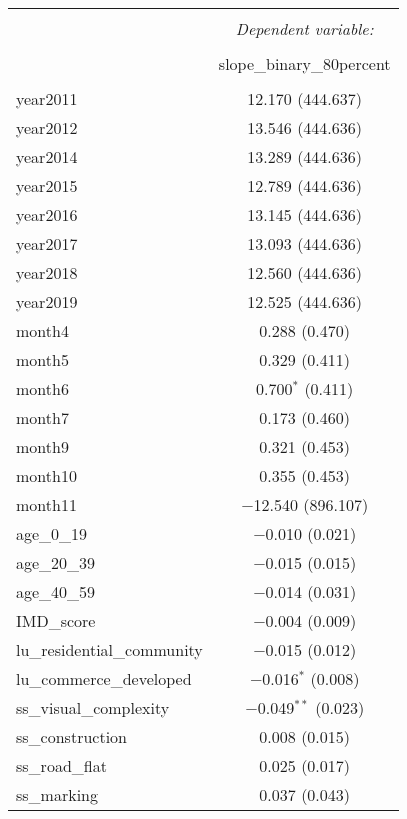 \begin{table}[!htbp] \centering 
  \caption{} 
  \label{} 
\small 
\begin{tabular}{@{\extracolsep{1pt}}lc} 
\\[-1.8ex]\hline 
\hline \\[-1.8ex] 
 & \multicolumn{1}{c}{\textit{Dependent variable:}} \\ 
\cline{2-2} 
\\[-1.8ex] & slope\_binary\_80percent \\ 
\hline \\[-1.8ex] 
 year2011 & 12.170 (444.637) \\ 
  year2012 & 13.546 (444.636) \\ 
  year2014 & 13.289 (444.636) \\ 
  year2015 & 12.789 (444.636) \\ 
  year2016 & 13.145 (444.636) \\ 
  year2017 & 13.093 (444.636) \\ 
  year2018 & 12.560 (444.636) \\ 
  year2019 & 12.525 (444.636) \\ 
  month4 & 0.288 (0.470) \\ 
  month5 & 0.329 (0.411) \\ 
  month6 & 0.700$^{*}$ (0.411) \\ 
  month7 & 0.173 (0.460) \\ 
  month9 & 0.321 (0.453) \\ 
  month10 & 0.355 (0.453) \\ 
  month11 & $-$12.540 (896.107) \\ 
  age\_0\_19 & $-$0.010 (0.021) \\ 
  age\_20\_39 & $-$0.015 (0.015) \\ 
  age\_40\_59 & $-$0.014 (0.031) \\ 
  IMD\_score & $-$0.004 (0.009) \\ 
  lu\_residential\_community & $-$0.015 (0.012) \\ 
  lu\_commerce\_developed & $-$0.016$^{*}$ (0.008) \\ 
  ss\_visual\_complexity & $-$0.049$^{**}$ (0.023) \\ 
  ss\_construction & 0.008 (0.015) \\ 
  ss\_road\_flat & 0.025 (0.017) \\ 
  ss\_marking & 0.037 (0.043) \\ 

\end{tabular}
\end{table}
